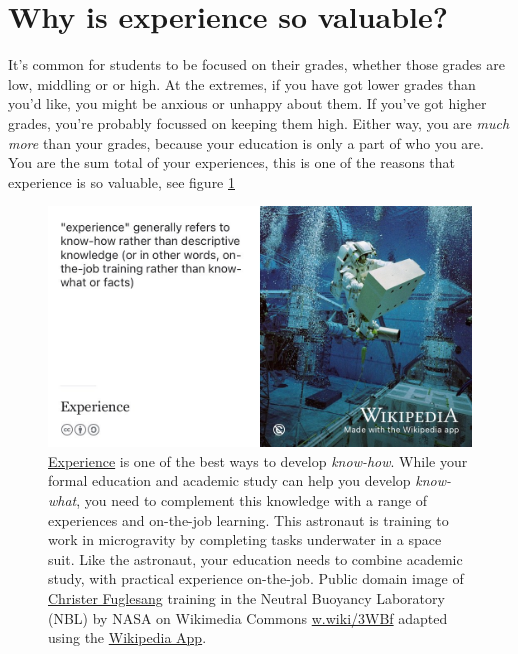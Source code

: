 \documentclass[
]{book}
\begin{document}
\hypertarget{why-is-experience-so-valuable}{%
\section{Why is experience so valuable?}\label{why-is-experience-so-valuable}}

It's common for students to be focused on their grades, whether those grades are low, middling or or high. At the extremes, if you have got lower grades than you'd like, you might be anxious or unhappy about them. If you've got higher grades, you're probably focussed on keeping them high. Either way, you are \emph{much more} than your grades, because your education is only a part of who you are. You are the sum total of your experiences, this is one of the reasons that experience is so valuable, see figure \ref{fig:experience-fig}

\begin{figure}

{\centering \includegraphics[width=1\linewidth]{images/experience} 

}

\caption{\href{https://en.wikipedia.org/wiki/Experience}{Experience} is one of the best ways to develop \emph{know-how}. While your formal education and academic study can help you develop \emph{know-what}, you need to complement this knowledge with a range of experiences and on-the-job learning. This astronaut is training to work in microgravity by completing tasks underwater in a space suit. Like the astronaut, your education needs to combine academic study, with practical experience on-the-job. Public domain image of \href{https://en.wikipedia.org/wiki/Christer_Fuglesang}{Christer Fuglesang} training in the Neutral Buoyancy Laboratory (NBL) by NASA on Wikimedia Commons \href{https://w.wiki/3WBf}{w.wiki/3WBf} adapted using the \href{https://apps.apple.com/us/app/wikipedia/id324715238}{Wikipedia App}.}\label{fig:experience-fig}
\end{figure}
\end{document}
